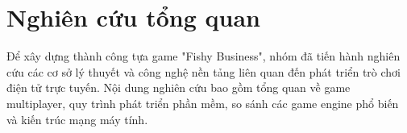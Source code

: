 \section{Nghiên cứu tổng quan}
Để xây dựng thành công tựa game "Fishy Business", nhóm đã tiến hành nghiên cứu các cơ sở lý thuyết và công nghệ nền tảng liên quan đến phát triển trò chơi điện tử trực tuyến. Nội dung nghiên cứu bao gồm tổng quan về game multiplayer, quy trình phát triển phần mềm, so sánh các game engine phổ biến và kiến trúc mạng máy tính.








\newpage